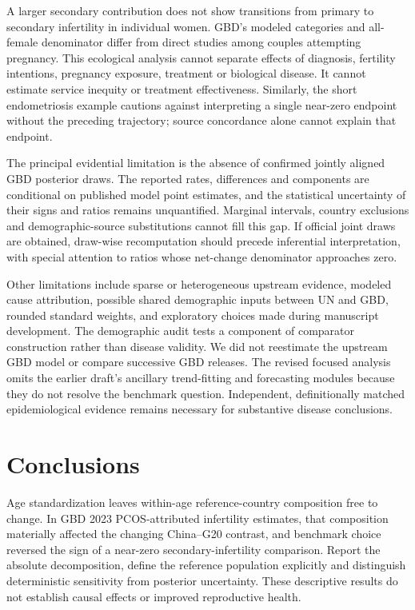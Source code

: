\documentclass[11pt,a4paper]{article}
\begin{document}
A larger secondary contribution does not show transitions from primary to secondary infertility in individual women. GBD's modeled categories and all-female denominator differ from direct studies among couples attempting pregnancy. This ecological analysis cannot separate effects of diagnosis, fertility intentions, pregnancy exposure, treatment or biological disease. It cannot estimate service inequity or treatment effectiveness. Similarly, the short endometriosis example cautions against interpreting a single near-zero endpoint without the preceding trajectory; source concordance alone cannot explain that endpoint.

The principal evidential limitation is the absence of confirmed jointly aligned GBD posterior draws. The reported rates, differences and components are conditional on published model point estimates, and the statistical uncertainty of their signs and ratios remains unquantified. Marginal intervals, country exclusions and demographic-source substitutions cannot fill this gap. If official joint draws are obtained, draw-wise recomputation should precede inferential interpretation, with special attention to ratios whose net-change denominator approaches zero.

Other limitations include sparse or heterogeneous upstream evidence, modeled cause attribution, possible shared demographic inputs between UN and GBD, rounded standard weights, and exploratory choices made during manuscript development. The demographic audit tests a component of comparator construction rather than disease validity. We did not reestimate the upstream GBD model or compare successive GBD releases. The revised focused analysis omits the earlier draft's ancillary trend-fitting and forecasting modules because they do not resolve the benchmark question. Independent, definitionally matched epidemiological evidence remains necessary for substantive disease conclusions.

\section{Conclusions}
Age standardization leaves within-age reference-country composition free to change. In GBD 2023 PCOS-attributed infertility estimates, that composition materially affected the changing China--G20 contrast, and benchmark choice reversed the sign of a near-zero secondary-infertility comparison. Report the absolute decomposition, define the reference population explicitly and distinguish deterministic sensitivity from posterior uncertainty. These descriptive results do not establish causal effects or improved reproductive health.
\end{document}
